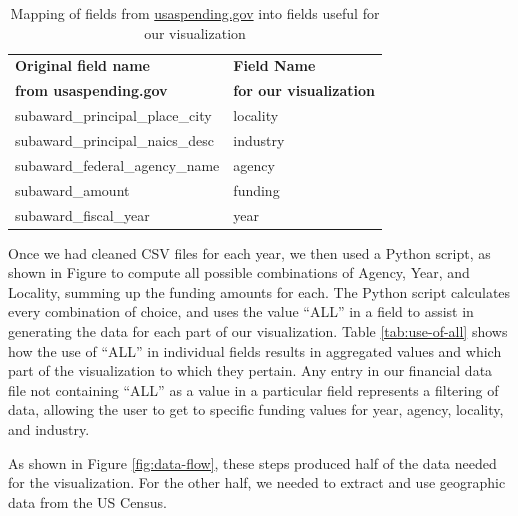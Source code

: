 \documentclass[10pt,journal,compsoc]{IEEEtran}
\begin{document}
\begin{table}[t]
\centering

\caption{Mapping of fields from \protect\url{usaspending.gov} into fields useful for our visualization}
\label{tab:data-mapping}

\begin{tabular}{l | l}
\hline
\textbf{Original field name} & \textbf{Field Name} \\
\textbf{from usaspending.gov} & \textbf{for our visualization} \\ \hline
subaward\_principal\_place\_city         & locality                         \\
subaward\_principal\_naics\_desc         & industry                         \\
subaward\_federal\_agency\_name          & agency                           \\
subaward\_amount                         & funding                          \\
subaward\_fiscal\_year                   & year                                 \\ \hline
\end{tabular}

\end{table}

Once we had cleaned CSV files for each year, we then used a Python script, as shown in Figure  to compute all possible combinations of Agency, Year, and Locality, summing up the funding amounts for each.  The Python script calculates every combination of choice, and uses the value ``ALL'' in a field to assist in generating the data for each part of our visualization.  Table \ref{tab:use-of-all} shows how the use of ``ALL'' in individual fields results in aggregated values and which part of the visualization to which they pertain.  Any entry in our financial data file not containing ``ALL'' as a value in a particular field represents a filtering of data, allowing the user to get to specific funding values for year, agency, locality, and industry.

As shown in Figure \ref{fig:data-flow}, these steps produced half of the data needed for the visualization.  For the other half, we needed to extract and use geographic data from the US Census.
\end{document}
